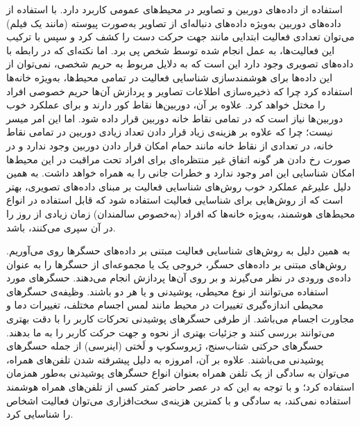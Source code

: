 استفاده از داده‌های دوربین و تصاویر در محیط‌های عمومی کاربرد دارد. با استفاده از داده‌های دوربین به‌ویژه داده‌های دنباله‌ای از تصاویر به‌صورت پیوسته (مانند یک فیلم) می‌توان تعدادی
فعالیت ابتدایی
مانند جهت حرکت دست را کشف کرد و سپس با ترکیب این فعالیت‌ها، به عمل انجام شده توسط شخص پی برد\cite{dhillon2017recent}.
اما نکته‌ای که در رابطه با داده‌های تصویری وجود دارد این است که به دلایل مربوط به حریم شخصی، نمی‌توان از این داده‌ها برای هوشمندسازی شناسایی فعالیت در تمامی محیط‌ها، به‌ویژه خانه‌ها استفاده کرد چرا که ذخیره‌سازی اطلاعات تصاویر و پردازش آن‌ها حریم خصوصی افراد را مختل خواهد کرد. علاوه بر آن، دوربین‌ها نقاط کور دارند و برای عملکرد خوب دوربین‌ها نیاز است که در تمامی نقاط خانه دوربین قرار داده شود. اما این امر میسر نیست؛ چرا که علاوه بر هزینه‌ی زیاد قرار دادن تعداد زیادی دوربین در تمامی نقاط خانه، در تعدادی از نقاط خانه مانند حمام امکان قرار دادن دوربین وجود ندارد و در صورت رخ دادن هر گونه اتفاق غیر منتظره‌ای برای افراد تحت مراقبت در این محیط‌ها امکان شناسایی این امر وجود ندارد و خطرات جانی را به همراه خواهد داشت. به همین دلیل علیرغم عملکرد خوب روش‌های شناسایی فعالیت بر مبنای
داده‌های تصویری\cite{mathew2023human}،
بهتر است که از روش‌هایی برای شناسایی فعالیت استفاده شود که قابل استفاده در انواع محیط‌های هوشمند، به‌ویژه خانه‌ها که افراد (به‌خصوص سالمندان) زمان زیادی از روز را در آن سپری می‌کنند، باشد.

به همین دلیل به روش‌های شناسایی فعالیت مبتنی بر داده‌های حسگرها روی می‌آوریم. روش‌های مبتنی بر داده‌های حسگر، خروجی یک یا مجموعه‌ای از حسگرها را به عنوان داده‌ی ورودی در نظر می‌گیرند و بر روی آن‌ها پردازش انجام می‌دهند. حسگرهای مورد استفاده می‌توانند از نوع
محیطی\cite{cook2012casas}،
پوشیدنی\cite{vavoulas2016mobiact}
و یا هر دو\cite{roggen2010walk}
باشند. وظیفه‌ی حسگرهای محیطی اندازه‌گیری تغییرات در محیط مانند لمس اجسام مختلف، تغییرات دما و مجاورت اجسام می‌باشد. از طرفی حسگرهای پوشیدنی تحرکات کاربر را با دقت بهتری می‌توانند بررسی کنند و جزئیات بهتری از نحوه و جهت حرکت کاربر را به ما بدهند. حسگرهای حرکتی
شتاب‌سنج،
ژیروسکوپ
و لَختی (اینرسی)
از جمله حسگرهای پوشیدنی می‌باشند. علاوه بر آن، امروزه به دلیل پیشرفته شدن تلفن‌های همراه، می‌توان به سادگی از یک تلفن همراه بعنوان انواع حسگرهای پوشیدنی به‌طور همزمان استفاده کرد\cite{reyes2016transition}؛
و با توجه به این که در عصر حاضر کمتر کسی از تلفن‌های همراه هوشمند استفاده نمی‌کند، به سادگی و با کمترین هزینه‌ی سخت‌افزاری می‌توان فعالیت اشخاص را شناسایی کرد.

